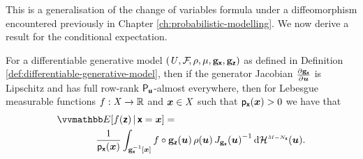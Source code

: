 This is a generalisation of the change of variables formula under a diffeomorphism encountered previously in Chapter \ref{ch:probabilistic-modelling}. We now derive a result for the conditional expectation.
\begin{proposition}
For a differentiable generative model $(\mathit{U},\mathcal{F}\kern-2pt,\rho,\mu,{\mathbf{g}}_{\boldsymbol{\mathsf{x}}},{\mathbf{g}}_{\boldsymbol{\mathsf{z}}})$ as defined in Definition \ref{def:differentiable-generative-model}, then if the generator Jacobian $\frac{\partial {\mathbf{g}}_{\boldsymbol{\mathsf{x}}}}{\partial \boldsymbol{u}}$ is Lipschitz and has full row-rank $\mathsf{P}_{\boldsymbol{\mathsf{u}}}$-almost everywhere, then for Lebesgue measurable functions $f : \mathit{X} \to \mathbb{R}$ and $\boldsymbol{x} \in \mathit{X}$ such that $\mathsf{p}_{\boldsymbol{\mathsf{x}}}(\boldsymbol{x}) > 0$ we have that
\begin{equation}\label{eq:cond-expectation-input-space}
\begin{split}
  &\expc{f(\rvct{z}) \gvn \rvct{x}=\vct{x}}
  =\,\\
  &\qquad\qquad
  \frac{1}{\pden{\rvct{x}}({\vct{x}})}
  \int_{\preimage{\genfunc_{\rvct{x}}}{\vct{x}}}
    f\circ\genfunc_{\rvct{z}}(\vct{u}) \, \rho(\vct{u}) \,
    \jacobproddet{\genfunc_{\rvct{x}}}{\vct{u}}^{-1}
  \,\dr\haum{M-N_{\rvct{x}}}(\vct{u}).
\end{split}
\end{equation}
\end{proposition}
